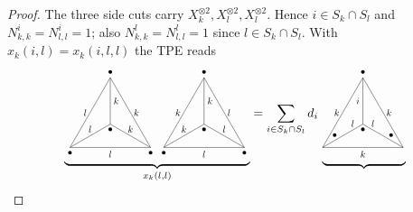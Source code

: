 \documentclass{amsart}
\begin{document}
\begin{proof}
The three side cuts carry $X_k^{\otimes2},X_l^{\otimes2},X_l^{\otimes2}$.
Hence $i\in S_k\cap S_l$ and $N_{k,k}^i=N_{l,l}^i=1$; also
$N_{k,k}^l=N_{l,l}^l=1$ since $l\in S_k\cap S_l$. With
$x_k(i,l)=x_k(i,l,l)$ the TPE reads
\begin{equation}
\underbrace{\vcenter{\hbox{\scalebox{.75}{\begin{tikzpicture}[scale=1.5]
\draw (0,0) node [below] {$\bullet$} -- (1,0)  node [below] {$l$}; \draw (1,0)  -- (2,0);
\draw (2,0) node [below] {$\bullet$} -- (1.5,.866) node [right] {$k$}; \draw (1.5,.866) -- (1,1.732);
\draw (1,1.732) node [above] {$\bullet$} -- (.5,.866) node [left] {$l$}; \draw (.5,.866) -- (0,0);
\draw (0,0) -- (.5,.2885) node [above] {$l$}; \draw (.5,.2885) -- (1,0.577);
\draw (1,0.577) node [below] {$\bullet$} -- (1,1.1545) node [right] {$k$}; \draw (1,1.1545) -- (1,1.732);
\draw (1,0.577) -- (1.5,.2885) node [above] {$k$}; \draw (1.5,.2885) -- (2,0);
\end{tikzpicture}}}}\,\vcenter{\hbox{\scalebox{.75}{\begin{tikzpicture}[scale=1.5]
\draw (0,0) node [below] {$\bullet$} -- (1,0)  node [below] {$l$}; \draw (1,0)  -- (2,0);
\draw (2,0) node [below] {$\bullet$} -- (1.5,.866) node [right] {$l$}; \draw (1.5,.866) -- (1,1.732);
\draw (1,1.732) node [above] {$\bullet$} -- (.5,.866) node [left] {$k$}; \draw (.5,.866) -- (0,0);
\draw (0,0) -- (.5,.2885) node [above] {$k$}; \draw (.5,.2885) -- (1,0.577);
\draw (1,0.577) node [below] {$\bullet$} -- (1,1.1545) node [right] {$k$}; \draw (1,1.1545) -- (1,1.732);
\draw (1,0.577) -- (1.5,.2885) node [above] {$l$}; \draw (1.5,.2885) -- (2,0);
\end{tikzpicture}}}}}_{x_k(l,l)}=\sum_{i\in S_k\cap S_l}d_i\,\underbrace{\vcenter{\hbox{\scalebox{.75}{\begin{tikzpicture}[scale=1.5]
\draw (0,0)  -- (1,0)  node [below] {$k$}; \draw (1,0)  -- (2,0);
\draw (2,0) -- (1.5,.866) node [right] {$k$}; \draw (1.5,.866) -- (1,1.732);
\draw (1,1.732) node [above] {$\bullet$} -- (.5,.866) node [left] {$k$}; \draw (.5,.866) -- (0,0);
\draw (0,0) -- (.75,.433) node [above] {$l$}; \draw (.75,.433) -- (1,0.577);
\draw (1,0.577) node [below] {$\bullet$} -- (1,1.1545) node [left] {$i$}; \draw (1,1.1545) -- (1,1.732);
\draw (1,0.577) -- (1.25,.433) node [above] {$l$}; \draw (1.25,.433) -- (2,0);
\node at (.3,.3) {$\bullet$};
\node at (2-.3,.3) {$\bullet$};
\end{tikzpicture}}}}\,\vcenter{\hbox{\scalebox{.75}{\begin{tikzpicture}[scale=1.5]

\end{tikzpicture}}}}}
\end{equation}
\end{proof}
\end{document}
